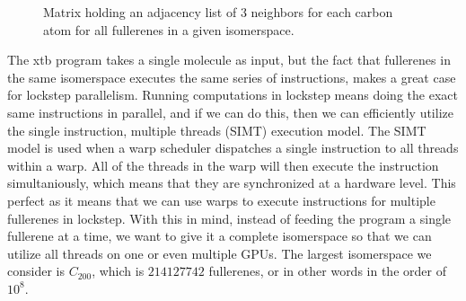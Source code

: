 \begin{figure}[H]
\begin{minipage}{.45\textwidth}
  \caption{Matrix holding an adjacency list of $3$ neighbors for each carbon atom for all fullerenes in a given isomerspace.}
  \label{fig:isomerspace_atom_neighbors}
\end{minipage}
\end{figure}


The xtb program takes a single molecule as input, but the fact that fullerenes in the same isomerspace executes the same series of instructions, makes a great case for lockstep parallelism. Running computations in lockstep means doing the exact same instructions in parallel, and if we can do this, then we can efficiently utilize the single instruction, multiple threads (SIMT) execution model. The SIMT model is used when a warp scheduler dispatches a single instruction to all threads within a warp. All of the threads in the warp will then execute the instruction simultaniously, which means that they are synchronized at a hardware level. This perfect as it means that we can use warps to execute instructions for multiple fullerenes in lockstep. With this in mind, instead of feeding the program a single fullerene at a time, we want to give it a complete isomerspace so that we can utilize all threads on one or even multiple GPUs. The largest isomerspace we consider is $C_{200}$, which is $214127742$ fullerenes, or in other words in the order of $10^8$.

